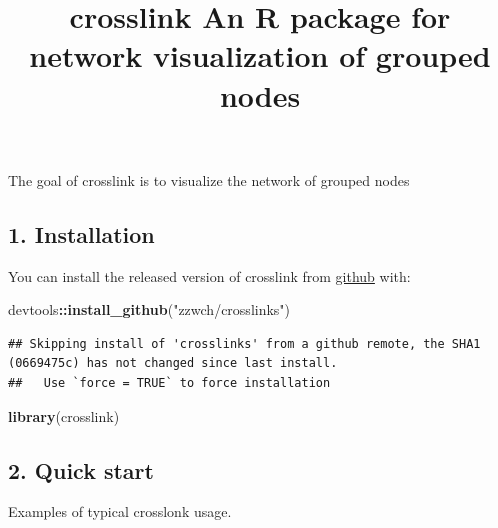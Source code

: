 \documentclass[
]{article}
\title{crosslink An R package for network visualization of grouped nodes}
\author{}
\date{\vspace{-2.5em}}
\newenvironment{Shaded}{\begin{snugshade}}{\end{snugshade}}
\newcommand{\DataTypeTok}[1]{\textcolor[rgb]{0.13,0.29,0.53}{#1}}
\newcommand{\KeywordTok}[1]{\textcolor[rgb]{0.13,0.29,0.53}{\textbf{#1}}}
\newcommand{\NormalTok}[1]{#1}
\newcommand{\OperatorTok}[1]{\textcolor[rgb]{0.81,0.36,0.00}{\textbf{#1}}}
\newcommand{\StringTok}[1]{\textcolor[rgb]{0.31,0.60,0.02}{#1}}
\begin{document}
\maketitle

The goal of crosslink is to visualize the network of grouped nodes

\hypertarget{installation}{%
\subsection{1. Installation}\label{installation}}

You can install the released version of crosslink from
\href{https://github.com/zzwch/crosslink}{github} with:

\begin{Shaded}
\begin{Highlighting}[]
\NormalTok{devtools}\OperatorTok{::}\KeywordTok{install_github}\NormalTok{(}\StringTok{"zzwch/crosslinks"}\NormalTok{) }
\end{Highlighting}
\end{Shaded}

\begin{verbatim}
## Skipping install of 'crosslinks' from a github remote, the SHA1 (0669475c) has not changed since last install.
##   Use `force = TRUE` to force installation
\end{verbatim}

\begin{Shaded}
\begin{Highlighting}[]
\KeywordTok{library}\NormalTok{(crosslink)}
\end{Highlighting}
\end{Shaded}

\hypertarget{quick-start}{%
\subsection{2. Quick start}\label{quick-start}}

Examples of typical crosslonk usage.

\begin{Shaded}
\end{Shaded}
\end{document}
